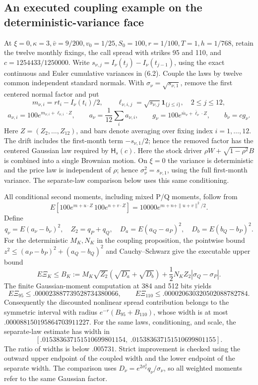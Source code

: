 \subsection{An executed coupling example on the deterministic-variance face}

At \(\xi=0,\kappa=3,\bar v=9/200,v_0=1/25,S_0=100,r=1/100,T=1,h=1/768\), retain the twelve
monthly fixings, the call spread with strikes 95 and 110, and
\(c=1254433/1250000\). Write
\(s_{\nu,j}=I_\nu(t_j)-I_\nu(t_{j-1})\), using the exact continuous and
Euler cumulative variances in (6.2). Couple the laws by twelve common
independent standard normals. With \(\sigma_\nu=\sqrt{s_{\nu,1}}\), remove the first
centered normal factor and put
\[
m_{\nu,i}=rt_i-I_\nu(t_i)/2,\qquad
\ell_{\nu,i,j}=\sqrt{s_{\nu,j}}\mathbf1_{\{j\le i\}},\quad 2\le j\le12,
\]
\[
a_{\nu,i}=100e^{m_{\nu,i}+\ell_{\nu,i}\cdot Z},\qquad
a_\nu=\frac1{12}\sum_i a_{\nu,i},\qquad
g_\nu=100e^{\bar m_\nu+\bar\ell_\nu\cdot Z},\qquad b_\nu=cg_\nu.
\]
Here \(Z=(Z_2,\ldots,Z_{12})\), and bars denote averaging over fixing
index \(i=1,\ldots,12\).
The drift includes the first-month term \(-s_{\nu,1}/2\); hence the removed
factor has the centered Gaussian law required by \(\mathsf H_s(c)\).
Here the stock driver \(\rho W+\sqrt{1-\rho^2}B\) is combined into a single
Brownian motion. On \(\xi=0\) the variance is deterministic and the price
law is independent of \(\rho\); hence \(\sigma_\nu^2=s_{\nu,1}\), using
the full first-month variance. The separate-law comparison below uses this
same conditioning.

All conditional second moments, including mixed P/Q moments, follow from
\[
E\!\left[100e^{m+u\cdot Z}\,100e^{n+v\cdot Z}\right]
=10000e^{m+n+\|u+v\|^2/2}.
\]
Define
\[
q_\nu=E(a_\nu-b_\nu)^2,\quad Z_2=q_P+q_Q,\quad
D_a=E(a_Q-a_P)^2,\quad D_b=E(b_Q-b_P)^2.
\]
For the deterministic \(M_K,N_K\) in the coupling proposition, the
pointwise bound \(z^2\le(a_P-b_P)^2+(a_Q-b_Q)^2\) and
Cauchy--Schwarz give the executable upper bound
\[
E\Xi_K\le B_K:=
M_K\sqrt{Z_2}(\sqrt{D_a}+\sqrt{D_b})
+\frac12N_KZ_2|\sigma_Q-\sigma_P|.
\]
The finite Gaussian-moment computation at 384 and 512 bits yields
\[
E\Xi_{95}\le .000023887739528734380066,\qquad
E\Xi_{110}\le .000020630320502088782784.
\]
Consequently the discounted nonlinear spread contribution belongs to the
symmetric interval with radius \(e^{-r}(B_{95}+B_{110})\), whose width is
at most \(.000088150195864703911227\). For the same laws, conditioning,
and scale, the separate-law estimate has width in
\[
[.015383637151510699801154,\;.015383637151510699801155].
\]
The ratio of widths is below \(.005731\). Strict improvement is checked
using the outward upper endpoint of the coupled width and the lower endpoint
of the separate width. The comparison uses
\(D_\nu=e^{2\sigma_\nu^2}q_\nu/\sigma_\nu\), so all weighted moments
refer to the same Gaussian factor.

